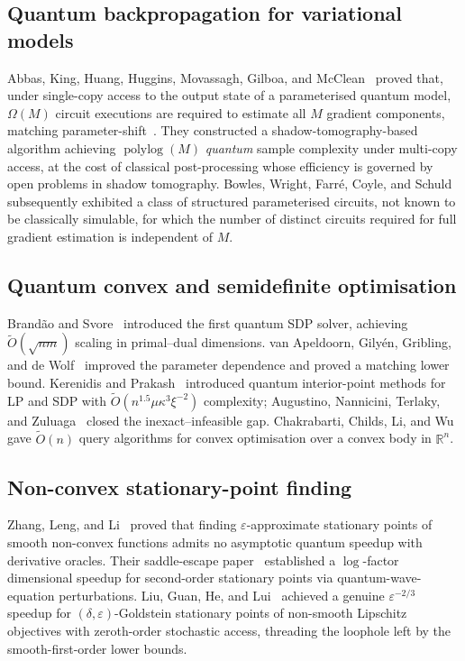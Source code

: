 \documentclass[11pt,a4paper]{article}
\theoremstyle{definition}
\DeclareMathOperator*{\polylog}{polylog}
\newcommand{\Otil}{\widetilde{O}}
\newcommand{\R}{\mathbb{R}}
\newcommand{\veps}{\varepsilon}
\begin{document}
\subsection{Quantum backpropagation for variational models}

Abbas, King, Huang, Huggins, Movassagh, Gilboa, and McClean~\cite{AbbasEtAl2023} proved that, under single-copy access to the output state of a parameterised quantum model, $\Omega(M)$ circuit executions are required to estimate all $M$ gradient components, matching parameter-shift~\cite{Mitarai2018,Schuld2019}. They constructed a shadow-tomography-based algorithm achieving $\polylog(M)$ \emph{quantum} sample complexity under multi-copy access, at the cost of classical post-processing whose efficiency is governed by open problems in shadow tomography. Bowles, Wright, Farr\'{e}, Coyle, and Schuld~\cite{Bowles2025} subsequently exhibited a class of structured parameterised circuits, not known to be classically simulable, for which the number of distinct circuits required for full gradient estimation is independent of $M$.

\subsection{Quantum convex and semidefinite optimisation}

Brand\~ao and Svore~\cite{BrandaoSvore2017} introduced the first quantum SDP solver, achieving $\Otil(\sqrt{nm})$ scaling in primal--dual dimensions. van Apeldoorn, Gily\'{e}n, Gribling, and de Wolf~\cite{vAGGdW2020} improved the parameter dependence and proved a matching lower bound. Kerenidis and Prakash~\cite{KerenidisPrakash2020} introduced quantum interior-point methods for LP and SDP with $\Otil(n^{1.5}\mu\kappa^3\xi^{-2})$ complexity; Augustino, Nannicini, Terlaky, and Zuluaga~\cite{Augustino2023} closed the inexact--infeasible gap. Chakrabarti, Childs, Li, and Wu~\cite{ChakrabartiEtAl2020} gave $\Otil(n)$ query algorithms for convex optimisation over a convex body in $\R^n$.

\subsection{Non-convex stationary-point finding}

Zhang, Leng, and Li~\cite{ZhangLengLi2023} proved that finding $\veps$-approximate stationary points of smooth non-convex functions admits no asymptotic quantum speedup with derivative oracles. Their saddle-escape paper~\cite{ZhangLengLi2021} established a $\log$-factor dimensional speedup for second-order stationary points via quantum-wave-equation perturbations. Liu, Guan, He, and Lui~\cite{LiuGuanHeLui2024} achieved a genuine $\veps^{-2/3}$ speedup for $(\delta,\veps)$-Goldstein stationary points of non-smooth Lipschitz objectives with zeroth-order stochastic access, threading the loophole left by the smooth-first-order lower bounds.
\end{document}
